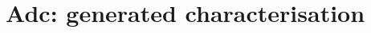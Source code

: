 \documentclass[11pt]{article}
\begin{document}
\section*{Adc: generated characterisation}

\end{document}
